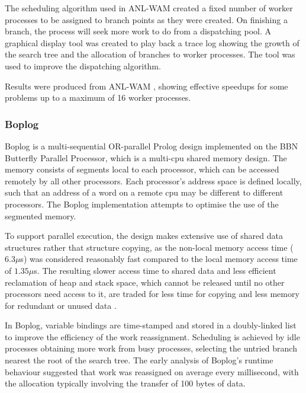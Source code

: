 The scheduling algorithm used in ANL-WAM created a fixed number of worker processes to
be assigned to branch points as they were created.  On finishing a branch, the process will
seek more work to do from a dispatching pool.  A graphical display tool was created to play
back a trace log showing the growth of the search tree and the allocation of branches to
worker processes.  The tool was used to improve the dispatching algorithm.

Results were produced from ANL-WAM \cite{DLO87}, showing effective speedups for some problems
up to a maximum of 16 worker processes.

\subsubsection{Boplog}


Boplog \cite{TL87}  is a multi-sequential OR-parallel Prolog design
implemented on the BBN Butterfly Parallel Processor, which is a multi-cpu
shared memory design.  The memory consists of segments local to each processor, which can
be accessed remotely by all other processors.  Each processor's address space is
defined locally, such that an address of a word on a remote cpu may be different to
different processors.  The Boplog
implementation attempts to optimise the use of the segmented memory.

To support parallel execution, the design 
makes extensive use of shared data structures rather that structure copying, as the
non-local memory access time ($6.3 \mu$s) was considered reasonably fast compared to the
local memory access time of $1.35\mu$s.  The resulting slower access time to shared data
and less efficient reclamation of heap and stack space, which cannot be released until no other
processors need access to it, are traded for less time for copying and less memory for
redundant or unused data \cite{TL87}.

In Boplog, variable bindings are time-stamped and stored in a doubly-linked list to
improve the efficiency of the work reassignment.  Scheduling is achieved by idle processes
obtaining more work from busy processes, selecting the untried branch nearest the
root of the search tree.  The early analysis of Boplog's runtime behaviour suggested that
work was reassigned on average every millisecond, with the allocation typically involving the
transfer of 100 bytes of data.

